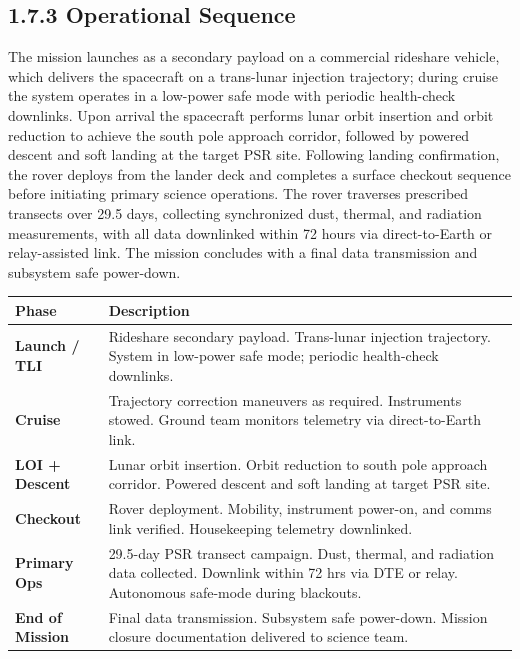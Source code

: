 \documentclass[11pt]{article}
\begin{document}
\subsection{1.7.3 \quad Operational Sequence}

The mission launches as a secondary payload on a commercial rideshare vehicle, which delivers the spacecraft on a trans-lunar injection trajectory; during cruise the system operates in a low-power safe mode with periodic health-check downlinks. Upon arrival the spacecraft performs lunar orbit insertion and orbit reduction to achieve the south pole approach corridor, followed by powered descent and soft landing at the target PSR site. Following landing confirmation, the rover deploys from the lander deck and completes a surface checkout sequence before initiating primary science operations. The rover traverses prescribed transects over 29.5 days, collecting synchronized dust, thermal, and radiation measurements, with all data downlinked within 72 hours via direct-to-Earth or relay-assisted link. The mission concludes with a final data transmission and subsystem safe power-down.

\vspace{4pt}

\renewcommand{\arraystretch}{1.15}
\begin{tabularx}{\textwidth}{@{}>{\bfseries\footnotesize}p{2.0cm}@{\hspace{8pt}}>{\footnotesize}X@{}}
\toprule
\normalfont\bfseries\footnotesize Phase & \normalfont\bfseries\footnotesize Description \\
\midrule
Launch / TLI   & Rideshare secondary payload. Trans-lunar injection trajectory. System in low-power safe mode; periodic health-check downlinks. \\
Cruise         & Trajectory correction maneuvers as required. Instruments stowed. Ground team monitors telemetry via direct-to-Earth link. \\
LOI + Descent  & Lunar orbit insertion. Orbit reduction to south pole approach corridor. Powered descent and soft landing at target PSR site. \\
Checkout       & Rover deployment. Mobility, instrument power-on, and comms link verified. Housekeeping telemetry downlinked. \\
Primary Ops    & 29.5-day PSR transect campaign. Dust, thermal, and radiation data collected. Downlink within 72 hrs via DTE or relay. Autonomous safe-mode during blackouts. \\
End of Mission & Final data transmission. Subsystem safe power-down. Mission closure documentation delivered to science team. \\
\bottomrule
\end{tabularx}
\end{document}
